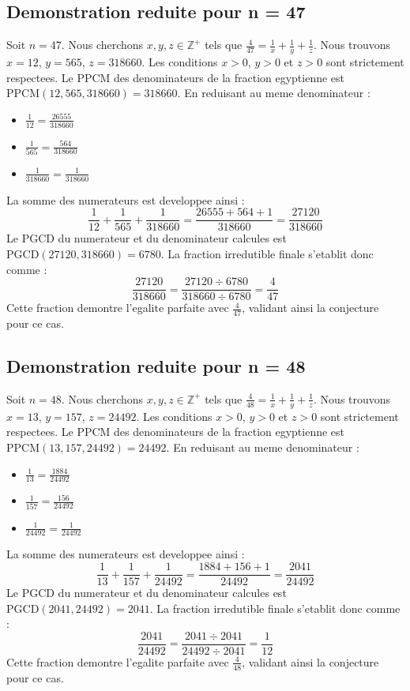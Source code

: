 \documentclass[11pt,a4paper]{article}
\begin{document}
\subsection{Demonstration reduite pour n = 47}
Soit $n = 47$. Nous cherchons $x, y, z \in \mathbb{Z}^{+}$ tels que $\frac{4}{47} = \frac{1}{x} + \frac{1}{y} + \frac{1}{z}$.
Nous trouvons $x = 12$, $y = 565$, $z = 318660$.
Les conditions $x > 0$, $y > 0$ et $z > 0$ sont strictement respectees.
Le PPCM des denominateurs de la fraction egyptienne est $\text{PPCM}(12, 565, 318660) = 318660$.
En reduisant au meme denominateur :
\begin{itemize}
    \item $\frac{1}{12} = \frac{26555}{318660}$
    \item $\frac{1}{565} = \frac{564}{318660}$
    \item $\frac{1}{318660} = \frac{1}{318660}$
\end{itemize}
La somme des numerateurs est developpee ainsi :
$$ \frac{1}{12} + \frac{1}{565} + \frac{1}{318660} = \frac{26555 + 564 + 1}{318660} = \frac{27120}{318660} $$
Le PGCD du numerateur et du denominateur calcules est $\text{PGCD}(27120, 318660) = 6780$.
La fraction irredutible finale s'etablit donc comme :
$$ \frac{27120}{318660} = \frac{27120 \div 6780}{318660 \div 6780} = \frac{4}{47} $$
Cette fraction demontre l'egalite parfaite avec $\frac{4}{47}$, validant ainsi la conjecture pour ce cas.

\subsection{Demonstration reduite pour n = 48}
Soit $n = 48$. Nous cherchons $x, y, z \in \mathbb{Z}^{+}$ tels que $\frac{4}{48} = \frac{1}{x} + \frac{1}{y} + \frac{1}{z}$.
Nous trouvons $x = 13$, $y = 157$, $z = 24492$.
Les conditions $x > 0$, $y > 0$ et $z > 0$ sont strictement respectees.
Le PPCM des denominateurs de la fraction egyptienne est $\text{PPCM}(13, 157, 24492) = 24492$.
En reduisant au meme denominateur :
\begin{itemize}
    \item $\frac{1}{13} = \frac{1884}{24492}$
    \item $\frac{1}{157} = \frac{156}{24492}$
    \item $\frac{1}{24492} = \frac{1}{24492}$
\end{itemize}
La somme des numerateurs est developpee ainsi :
$$ \frac{1}{13} + \frac{1}{157} + \frac{1}{24492} = \frac{1884 + 156 + 1}{24492} = \frac{2041}{24492} $$
Le PGCD du numerateur et du denominateur calcules est $\text{PGCD}(2041, 24492) = 2041$.
La fraction irredutible finale s'etablit donc comme :
$$ \frac{2041}{24492} = \frac{2041 \div 2041}{24492 \div 2041} = \frac{1}{12} $$
Cette fraction demontre l'egalite parfaite avec $\frac{4}{48}$, validant ainsi la conjecture pour ce cas.
\end{document}
